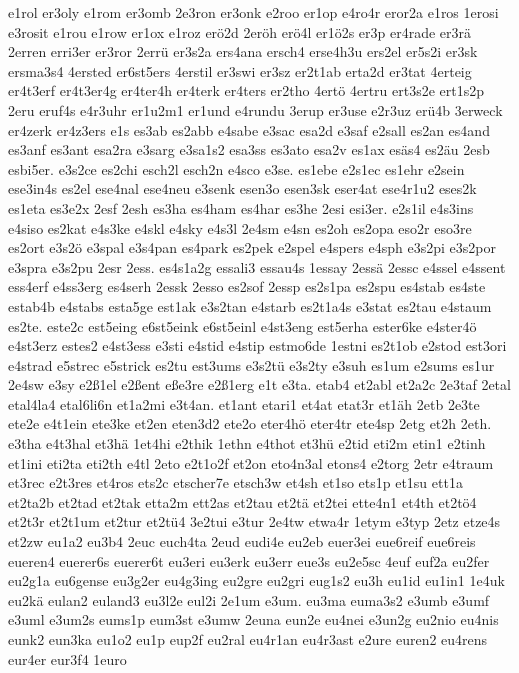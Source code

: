 {e1rol
er3oly
e1rom
er3omb
2e3ron
er3onk
e2roo
er1op
e4ro4r
eror2a
e1ros
1erosi
e3rosit
e1rou
e1row
er1ox
e1roz
erö2d
2eröh
erö4l
er1ö2s
er3p
er4rade
er3rä
2erren
erri3er
er3ror
2errü
er3s2a
ers4ana
ersch4
erse4h3u
ers2el
er5s2i
er3sk
ersma3s4
4ersted
er6st5ers
4erstil
er3swi
er3sz
er2t1ab
erta2d
er3tat
4erteig
er4t3erf
er4t3er4g
er4ter4h
er4terk
er4ters
er2tho
4ertö
4ertru
ert3s2e
ert1s2p
2eru
eruf4s
e4r3uhr
er1u2m1
er1und
e4rundu
3erup
er3use
e2r3uz
erü4b
3erweck
er4zerk
er4z3ers
e1s
es3ab
es2abb
e4sabe
e3sac
esa2d
e3saf
e2sall
es2an
es4and
es3anf
es3ant
esa2ra
e3sarg
e3sa1s2
esa3ss
es3ato
esa2v
es1ax
esäs4
es2äu
2esb
esbi5er.
e3s2ce
es2chi
esch2l
esch2n
e4sco
e3se.
es1ebe
e2s1ec
es1ehr
e2sein
ese3in4s
es2el
ese4nal
ese4neu
e3senk
esen3o
esen3sk
eser4at
ese4r1u2
eses2k
es1eta
es3e2x
2esf
2esh
es3ha
es4ham
es4har
es3he
2esi
esi3er.
e2s1il
e4s3ins
e4siso
es2kat
e4s3ke
e4skl
e4sky
e4s3l
2e4sm
e4sn
es2oh
es2opa
eso2r
eso3re
es2ort
e3s2ö
e3spal
e3s4pan
es4park
es2pek
e2spel
e4spers
e4sph
e3s2pi
e3s2por
e3spra
e3s2pu
2esr
2ess.
es4s1a2g
essali3
essau4s
1essay
2essä
2essc
e4ssel
e4ssent
ess4erf
e4ss3erg
es4serh
2essk
2esso
es2sof
2essp
es2s1pa
es2spu
es4stab
es4ste
estab4b
e4stabs
esta5ge
est1ak
e3s2tan
e4starb
es2t1a4s
e3stat
es2tau
e4staum
es2te.
este2c
est5eing
e6st5eink
e6st5einl
e4st3eng
est5erha
ester6ke
e4ster4ö
e4st3erz
estes2
e4st3ess
e3sti
e4stid
e4stip
estmo6de
1estni
es2t1ob
e2stod
est3ori
e4strad
e5strec
e5strick
es2tu
est3ums
e3s2tü
e3s2ty
e3suh
es1um
e2sums
es1ur
2e4sw
e3sy
e2ß1el
e2ßent
eße3re
e2ß1erg
e1t
e3ta.
etab4
et2abl
et2a2c
2e3taf
2etal
etal4la4
etal6li6n
et1a2mi
e3t4an.
et1ant
etari1
et4at
etat3r
et1äh
2etb
2e3te
ete2e
e4t1ein
ete3ke
et2en
eten3d2
ete2o
eter4hö
eter4tr
ete4sp
2etg
et2h
2eth.
e3tha
e4t3hal
et3hä
1et4hi
e2thik
1ethn
e4thot
et3hü
e2tid
eti2m
etin1
e2tinh
et1ini
eti2ta
eti2th
e4tl
2eto
e2t1o2f
et2on
eto4n3al
etons4
e2torg
2etr
e4traum
et3rec
e2t3res
et4ros
ets2c
etscher7e
etsch3w
et4sh
et1so
ets1p
et1su
ett1a
et2ta2b
et2tad
et2tak
etta2m
ett2as
et2tau
et2tä
et2tei
ette4n1
et4th
et2tö4
et2t3r
et2t1um
et2tur
et2tü4
3e2tui
e3tur
2e4tw
etwa4r
1etym
e3typ
2etz
etze4s
et2zw
eu1a2
eu3b4
2euc
euch4ta
2eud
eudi4e
eu2eb
euer3ei
eue6reif
eue6reis
eueren4
euerer6s
euerer6t
eu3eri
eu3erk
eu3err
eue3s
eu2e5sc
4euf
euf2a
eu2fer
eu2g1a
eu6gense
eu3g2er
eu4g3ing
eu2gre
eu2gri
eug1s2
eu3h
eu1id
eu1in1
1e4uk
eu2kä
eulan2
euland3
eu3l2e
eul2i
2e1um
e3um.
eu3ma
euma3s2
e3umb
e3umf
e3uml
e3um2s
eums1p
eum3st
e3umw
2euna
eun2e
eu4nei
e3un2g
eu2nio
eu4nis
eunk2
eun3ka
eu1o2
eu1p
eup2f
eu2ral
eu4r1an
eu4r3ast
e2ure
euren2
eu4rens
eur4er
eur3f4
1euro
}
